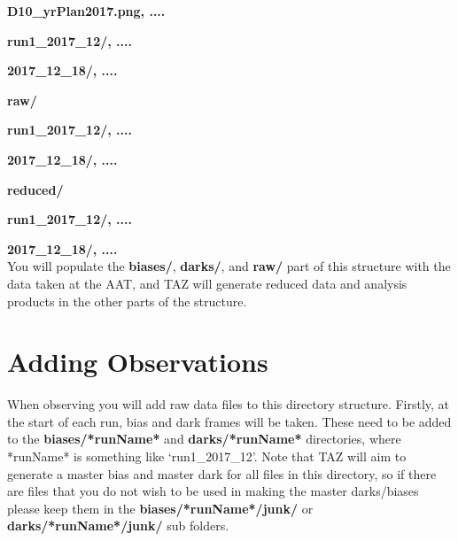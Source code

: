 \documentclass[12pt]{article}
\begin{document}
\hspace{15mm} \textbf{D10\_yrPlan2017.png, ....} 
\vspace{1mm}

\hspace{15mm} \textbf{run1\_2017\_12/, ....} 
\vspace{1mm}

\hspace{30mm} \textbf{2017\_12\_18/, ....}
\vspace{1mm}

\hspace{10mm} \textbf{raw/} 
\vspace{1mm}

\hspace{15mm} \textbf{run1\_2017\_12/, ....} 
\vspace{1mm}

\hspace{30mm} \textbf{2017\_12\_18/, ....} 
\vspace{1mm}

\hspace{10mm} \textbf{reduced/}
\vspace{1mm}

\hspace{15mm} \textbf{run1\_2017\_12/, ....} 
\vspace{1mm}

\hspace{30mm} \textbf{2017\_12\_18/, ....} \\

You will populate the \textbf{biases/}, \textbf{darks/}, and \textbf{raw/} part of this structure with the data taken at the AAT, and TAZ will generate reduced data and analysis products in the other parts of the structure.  


\section{Adding Observations}

When observing you will add raw data files to this directory structure. Firstly, at the start of each run, bias and dark frames will be taken. These need to be added to the \textbf{biases/*runName*} and \textbf{darks/*runName*} directories, where *runName* is something like `run1\_2017\_12'. Note that TAZ will aim to generate a master bias and master dark for all files in this directory, so if there are files that you do not wish to be used in making the master darks/biases please keep them in the  \textbf{biases/*runName*/junk/} or \textbf{darks/*runName*/junk/} sub folders.
\end{document}
